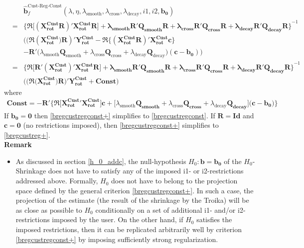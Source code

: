 \documentclass[11pt]{article}
\begin{document}
\begin{eqnarray}\label{bregcustregconst+}
&&\mathbf{\hat{b}}^{\textrm{Cust-Reg-Const}}_f(\lambda,\eta,\lambda_{\textrm{smooth}},\lambda_{\textrm{cross}},\lambda_{\textrm{decay}},i1,i2,\mathbf{b_0})\nonumber\\
&=&\mathbf{\Big\{\Re\Big[(X_{\textrm{rot}}^{\textrm{Cust} }R)' X_{\textrm{rot}}^{\textrm{Cust}}R\Big]+
\lambda_{\textrm{smooth}}\mathbf{R'Q_{smooth}}R+\lambda_{\textrm{cross}}\mathbf{R'Q_{cross}R}+\lambda_{\textrm{decay}}\mathbf{R'Q_{decay}R}
\Big\}}^{-1}\nonumber\\
&&\Bigg((\Re(\mathbf{X_{\textrm{rot}}^{\textrm{Cust}})R})'
\mathbf{Y_{\textrm{rot}}^{\textrm{Cust}}}-\Re\bigg\{(\mathbf{X_{\textrm{rot}}^{\textrm{Cust}}R})'\mathbf{X_{\textrm{rot}}^{\textrm{Cust}}c}\bigg\}\nonumber\\
&&-
\mathbf{R}'\Big(\lambda_{\textrm{smooth}}\mathbf{Q}_{\textrm{smooth}}+\lambda_{\textrm{cross}}\mathbf{Q}_{\textrm{cross}}+
\lambda_{\textrm{decay}}\mathbf{Q}_{\textrm{decay}}\Big)\mathbf{(c-b_0)}\Bigg)\nonumber\\
&=&\mathbf{\Big\{\Re\Big[R'(X_{\textrm{rot}}^{\textrm{Cust} })' X_{\textrm{rot}}^{\textrm{Cust}}R\Big]+
\lambda_{\textrm{smooth}}\mathbf{R'Q_{smooth}}R+\lambda_{\textrm{cross}}\mathbf{R'Q_{cross}R}+\lambda_{\textrm{decay}}\mathbf{R'Q_{decay}R}
\Big\}}^{-1}\nonumber\\
&&\Big((\Re(\mathbf{X_{\textrm{rot}}^{\textrm{Cust}})R)}'
\mathbf{Y_{\textrm{rot}}^{\textrm{Cust}}}+\mathbf{Const}\Big)
\end{eqnarray}
where 
\begin{eqnarray*}
\mathbf{Const}=-\mathbf{R}'\Bigg\{\Re\Big[\mathbf{X_{\textrm{rot}}^{\textrm{Cust}}}'\mathbf{X_{\textrm{rot}}^{\textrm{Cust}}}\Big]\mathbf{c}+
\Big[\lambda_{\textrm{smooth}}\mathbf{Q_{\textrm{smooth}}}+\lambda_{\textrm{cross}}\mathbf{Q_{\textrm{cross}}}+
\lambda_{\textrm{decay}}\mathbf{Q_{\textrm{decay}}}\Big](\mathbf{c-b_0)}\Bigg\}
\end{eqnarray*}
If $\mathbf{b_0=0}$ then \ref{bregcustregconst+} simplifies to \ref{bregcustregconst}. If $\mathbf{R=Id}$ and $\mathbf{c=0}$ (no restrictions imposed), then \ref{bregcustregconst+} simplifies to \ref{bregcustreg+}.\\

\textbf{Remark}
\begin{itemize}
\item As discussed in section \ref{h_0_addc}, the null-hypothesis $H_0: \mathbf{b=b_0}$ of the $H_0$-Shrinkage does not have to satisfy any of the imposed i1- or i2-restrictions addressed above. Formally,  $H_0$ does not have to belong to the projection space defined by the general criterion \ref{bregcustregconst+}. In such a case, the projection of the estimate (the result of the shrinkage by the Troika) will be as close as possible to $H_0$ conditionally on a set of  additional i1- and/or i2-restrictions  imposed by the user. On the other hand, if $H_0$ satisfies the imposed restrictions, then it can be replicated arbitrarily well by criterion \ref{bregcustregconst+} by imposing sufficiently strong regularization.
\end{itemize}
\end{document}
